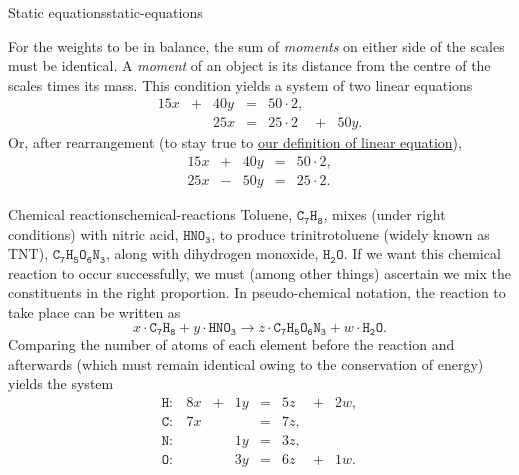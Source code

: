 \begin{example}{Static equations}{static-equations}
\begin{figure}[H]
\begin{subfigure}[b]{.45\textwidth}
  \end{subfigure}
 \end{figure}

 For the weights to be in balance, the sum of \emph{moments} on either side of
 the scales must be identical. A \emph{moment} of an object is its distance from
 the centre of the scales times its mass. This condition yields a system of two
 linear equations
 \[
  \begin{array}{ccccccc}
   15x & + & 40y & = & 50 \cdot 2, & &\\
       &   & 25x & = & 25 \cdot 2 & + & 50y.
  \end{array}
 \]
 Or, after rearrangement (to stay true to \hyperref[def:linear-equation]{our
 definition of linear equation}),
 \[
  \begin{array}{ccccc}
   15x & + & 40y & = & 50 \cdot 2,\\
   25x & - & 50y & = & 25 \cdot 2.
  \end{array}
 \]
\end{example}

\begin{example}{Chemical reactions}{chemical-reactions}
 Toluene, $\mathtt{C_7 H_8}$, mixes (under right conditions) with nitric acid,
 $\mathtt{HNO_3}$, to produce trinitrotoluene (widely known as TNT),
 $\mathtt{C_7H_5O_6N_3}$, along with dihydrogen monoxide, $\mathtt{H_2O}$. If we
 want this chemical reaction to occur successfully, we must (among other things)
 ascertain we mix the constituents in the right proportion. In pseudo-chemical
 notation, the reaction to take place can be written as
 \[
  x \cdot \mathtt{C_7H_8} + y \cdot \mathtt{HNO_3} \longrightarrow z \cdot
  \mathtt{C_7H_5O_6N_3} + w \cdot \mathtt{H_2O}.
 \]
 Comparing the number of atoms of each element before the reaction and
 afterwards (which must remain identical owing to the conservation of energy)
 yields the system
 \[
  \begin{array}{cccccccc}
   \mathtt{H}: & 8x & + & 1y & = & 5z & + & 2w,\\
   \mathtt{C}: & 7x &   &    & = & 7z,&   &\\
   \mathtt{N}: &    &   & 1y & = & 3z,&   &\\
   \mathtt{O}: &    &   & 3y & = & 6z & + & 1w.
  \end{array}
 \]
\end{example}

